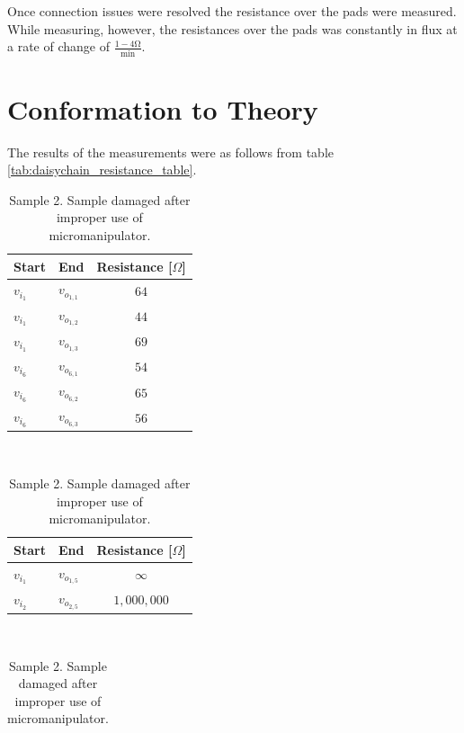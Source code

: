 Once connection issues were resolved the resistance over the pads were measured. While measuring, however, the resistances over the pads was constantly in flux at a rate of change of $\frac{1-4 \unit{\ohm}}{\unit{\minute}}$.

\section{Conformation to Theory}

The results of the measurements were as follows from table \ref{tab:daisychain_resistance_table}.

\begin{table}
    \centering
    \begin{subtable}[t]{0.3\textwidth}
        \centering
        \begin{tabular}{| l | l | c |}
            \hline
            Start & End & Resistance [$\Omega$] \\
            \hline
            \hline
            $v_{i_1}$ & $v_{o_{1,1}}$ & $64$ \\
            $v_{i_1}$ & $v_{o_{1,2}}$ & $44$ \\
            $v_{i_1}$ & $v_{o_{1,3}}$ & $69$ \\
            $v_{i_6}$ & $v_{o_{6,1}}$ & $54$ \\
            $v_{i_6}$ & $v_{o_{6,2}}$ & $65$ \\
            $v_{i_6}$ & $v_{o_{6,3}}$ & $56$ \\
            \hline
        \end{tabular}
        \caption{Sample 1.}
    \end{subtable}
    ~
    \begin{subtable}{0.3\textwidth}
        \centering
        \begin{tabular}[t]{| l | l | c |}
            \hline
            Start & End & Resistance [$\Omega$] \\
            \hline
            \hline
            $v_{i_1}$ & $v_{o_{1,5}}$ & $\infty$ \\
            $v_{i_2}$ & $v_{o_{2,5}}$ & $1,000,000$ \\
            \hline
        \end{tabular}
        \caption{Sample 2. Sample damaged after improper use of micromanipulator.}
    \end{subtable}
    ~
    \begin{subtable}[t]{0.3\textwidth}
        \centering
        \begin{tabular}{| l | l | c |}

\end{tabular}
\end{subtable}
\end{table}
